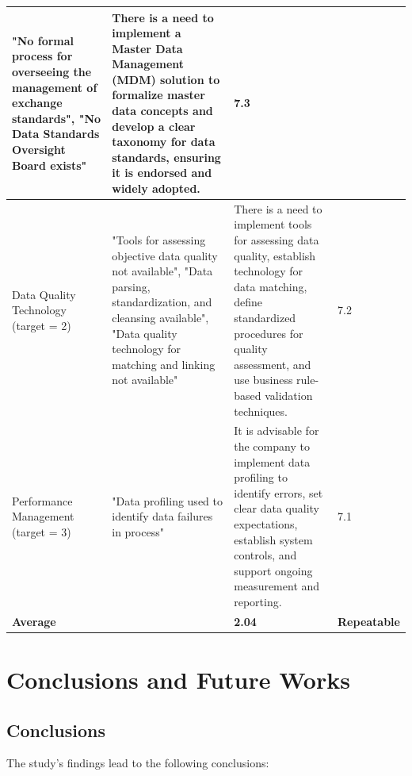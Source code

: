 \documentclass[conference]{IEEEtran}
\begin{document}
\begin{table}[h]
\begin{tabular}{|p{2cm}|p{5cm}|p{5cm}|p{2cm}|}
"No formal process for overseeing the management of exchange standards", 
"No Data Standards Oversight Board exists"
& 
There is a need to implement a Master Data Management (MDM) solution to formalize master data concepts and develop a clear taxonomy for data standards, ensuring it is endorsed and widely adopted.
& 7.3 \\
\hline
Data Quality Technology (target = 2) & 
"Tools for assessing objective data quality not available", 
"Data parsing, standardization, and cleansing available", 
"Data quality technology for matching and linking not available"
& 
There is a need to implement tools for assessing data quality, establish technology for data matching, define standardized procedures for quality assessment, and use business rule-based validation techniques.
& 7.2 \\

\hline
Performance Management (target = 3) & "Data profiling used to identify data failures in process" & It is advisable for the company to implement data profiling to identify errors, set clear data quality expectations, establish system controls, and support ongoing measurement and reporting. & 7.1 \\
\hline
\multicolumn{2}{|l|}{\textbf{Average}} & \textbf{2.04} & \textbf{Repeatable} \\
\hline
\end{tabular}
\end{table}


\section{Conclusions and Future Works}

\subsection{Conclusions}

The study's findings lead to the following conclusions:
\end{document}

